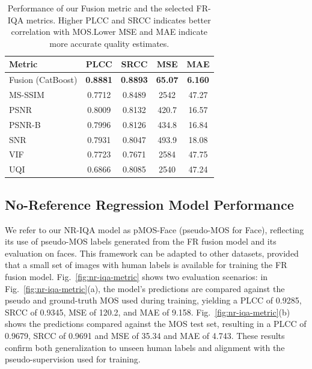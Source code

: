 \begin{table}
\centering
\caption{Performance of our Fusion metric and the selected FR-IQA metrics. Higher PLCC and SRCC indicates better correlation with MOS.\@ Lower MSE and MAE indicate more accurate quality estimates.}\label{tab:fr_model_score}
\begin{tabular}{lcccc}
\hline %
\textbf{Metric} & \textbf{PLCC} & \textbf{SRCC} & \textbf{MSE} & \textbf{MAE} \\
\hline %
Fusion (CatBoost) & \textbf{0.8881} & \textbf{0.8893} & \textbf{65.07} & \textbf{6.160} \\
MS-SSIM & 0.7712 & 0.8489 & 2542 & 47.27 \\
PSNR & 0.8009 & 0.8132 & 420.7 & 16.57 \\
PSNR-B & 0.7996 & 0.8126 & 434.8 & 16.84 \\
SNR & 0.7931 & 0.8047 & 493.9 & 18.08 \\
VIF & 0.7723 & 0.7671 & 2584 & 47.75 \\
UQI & 0.6866 & 0.8085 & 2540 & 47.24 \\
\hline %
\end{tabular}
\end{table}

\subsection{No-Reference Regression Model Performance}

We refer to our NR-IQA model as pMOS-Face (pseudo-MOS for Face), reflecting its use of pseudo-MOS labels generated from the FR fusion model and its evaluation on faces. This framework can be adapted to other datasets, provided that a small set of images with human labels is available for training the FR fusion model. Fig.~\ref{fig:nr-iqa-metric} shows two evaluation scenarios: in Fig.~\ref{fig:nr-iqa-metric}(a), the model's predictions are compared against the pseudo and ground-truth MOS used during training, yielding a PLCC of 0.9285, SRCC of 0.9345, MSE of 120.2, and MAE of 9.158. Fig.~\ref{fig:nr-iqa-metric}(b) shows the predictions compared against the MOS test set, resulting in a PLCC of 0.9679, SRCC of 0.9691 and MSE of 35.34 and MAE of 4.743. These results confirm both generalization to unseen human labels and alignment with the pseudo-supervision used for training. %


